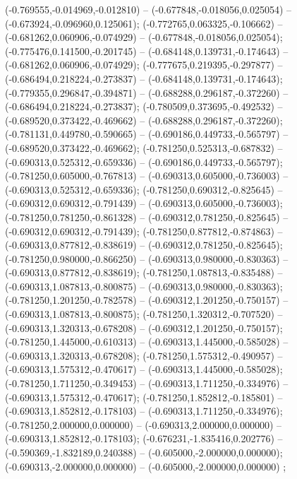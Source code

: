  (-0.769555,-0.014969,-0.012810) -- (-0.677848,-0.018056,0.025054) -- (-0.673924,-0.096960,0.125061);
 (-0.772765,0.063325,-0.106662) -- (-0.681262,0.060906,-0.074929) -- (-0.677848,-0.018056,0.025054);
 (-0.775476,0.141500,-0.201745) -- (-0.684148,0.139731,-0.174643) -- (-0.681262,0.060906,-0.074929);
 (-0.777675,0.219395,-0.297877) -- (-0.686494,0.218224,-0.273837) -- (-0.684148,0.139731,-0.174643);
 (-0.779355,0.296847,-0.394871) -- (-0.688288,0.296187,-0.372260) -- (-0.686494,0.218224,-0.273837);
 (-0.780509,0.373695,-0.492532) -- (-0.689520,0.373422,-0.469662) -- (-0.688288,0.296187,-0.372260);
 (-0.781131,0.449780,-0.590665) -- (-0.690186,0.449733,-0.565797) -- (-0.689520,0.373422,-0.469662);
 (-0.781250,0.525313,-0.687832) -- (-0.690313,0.525312,-0.659336) -- (-0.690186,0.449733,-0.565797);
 (-0.781250,0.605000,-0.767813) -- (-0.690313,0.605000,-0.736003) -- (-0.690313,0.525312,-0.659336);
 (-0.781250,0.690312,-0.825645) -- (-0.690312,0.690312,-0.791439) -- (-0.690313,0.605000,-0.736003);
 (-0.781250,0.781250,-0.861328) -- (-0.690312,0.781250,-0.825645) -- (-0.690312,0.690312,-0.791439);
 (-0.781250,0.877812,-0.874863) -- (-0.690313,0.877812,-0.838619) -- (-0.690312,0.781250,-0.825645);
 (-0.781250,0.980000,-0.866250) -- (-0.690313,0.980000,-0.830363) -- (-0.690313,0.877812,-0.838619);
 (-0.781250,1.087813,-0.835488) -- (-0.690313,1.087813,-0.800875) -- (-0.690313,0.980000,-0.830363);
 (-0.781250,1.201250,-0.782578) -- (-0.690312,1.201250,-0.750157) -- (-0.690313,1.087813,-0.800875);
 (-0.781250,1.320312,-0.707520) -- (-0.690313,1.320313,-0.678208) -- (-0.690312,1.201250,-0.750157);
 (-0.781250,1.445000,-0.610313) -- (-0.690313,1.445000,-0.585028) -- (-0.690313,1.320313,-0.678208);
 (-0.781250,1.575312,-0.490957) -- (-0.690313,1.575312,-0.470617) -- (-0.690313,1.445000,-0.585028);
 (-0.781250,1.711250,-0.349453) -- (-0.690313,1.711250,-0.334976) -- (-0.690313,1.575312,-0.470617);
 (-0.781250,1.852812,-0.185801) -- (-0.690313,1.852812,-0.178103) -- (-0.690313,1.711250,-0.334976);
 (-0.781250,2.000000,0.000000) -- (-0.690313,2.000000,0.000000) -- (-0.690313,1.852812,-0.178103);
 (-0.676231,-1.835416,0.202776) -- (-0.590369,-1.832189,0.240388) -- (-0.605000,-2.000000,0.000000);
 (-0.690313,-2.000000,0.000000) -- (-0.605000,-2.000000,0.000000) ;
